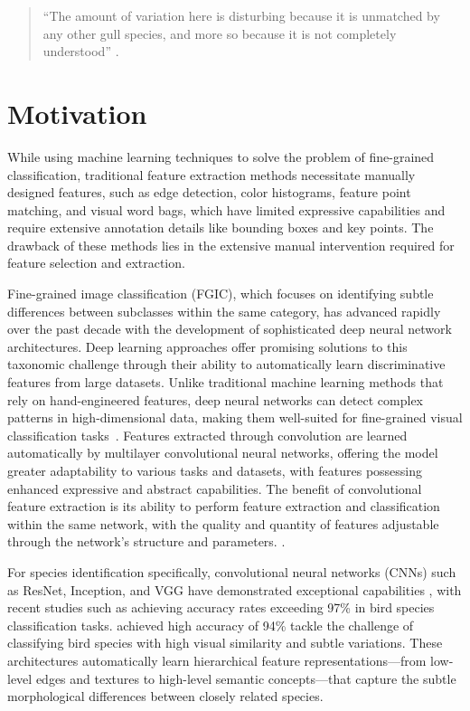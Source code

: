 \documentclass[a4paper,12pt]{article}
\begin{document}
    \begin{quote}
        ``The amount of variation here is disturbing because it is unmatched by any other gull species, and more so because it is not completely understood'' \citep{adriaens2022gulls}.
    \end{quote}

\section{Motivation}

While using machine learning techniques to solve the problem of fine-grained classification, traditional feature extraction methods necessitate manually designed features, such as edge detection, color histograms, feature point matching, and visual word bags, which have limited expressive capabilities and require extensive annotation details like bounding boxes and key points. The drawback of these methods lies in the extensive manual intervention required for feature selection and extraction.\citep{Lu2024}


Fine-grained image classification (FGIC), which focuses on identifying subtle differences between subclasses within the same category, has advanced rapidly over the past decade with the development of sophisticated deep neural network architectures. Deep learning approaches offer promising solutions to this taxonomic challenge through their ability to automatically learn discriminative features from large datasets\citep{source4}. Unlike traditional machine learning methods that rely on hand-engineered features, deep neural networks can detect complex patterns in high-dimensional data, making them well-suited for fine-grained visual classification tasks~\citep{valan}. Features extracted through convolution are learned automatically by multilayer convolutional neural networks, offering the model greater adaptability to various tasks and datasets, with features possessing enhanced expressive and abstract capabilities. The benefit of convolutional feature extraction is its ability to perform feature extraction and classification within the same network, with the quality and quantity of features adjustable through the network’s structure and parameters. \citep{source2}.

For species identification specifically, convolutional neural networks (CNNs) such as ResNet, Inception, and VGG have demonstrated exceptional capabilities \cite{source3}\cite{essay101313}, with recent studies such as \citep{transferln97} achieving accuracy rates exceeding 97\% in bird species classification tasks. \citep{ALFATEMI2024558} achieved high accuracy of 94\% tackle the challenge of classifying bird species with high visual similarity and subtle variations. These architectures automatically learn hierarchical feature representations—from low-level edges and textures to high-level semantic concepts—that capture the subtle morphological differences between closely related species.
\end{document}
